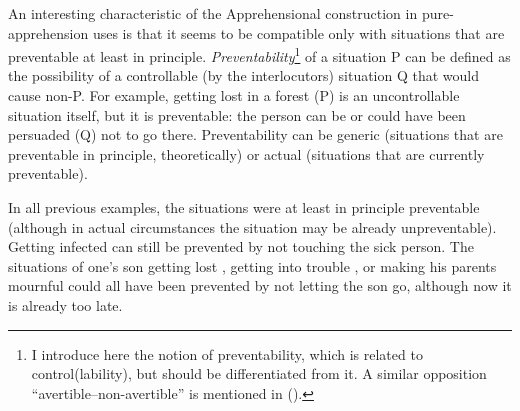 \documentclass[output=paper,colorlinks,citecolor=brown]{langscibook}
\begin{document}
\z



\z

 An interesting characteristic of the Apprehensional construction in pure\hyp apprehension uses is that it seems to be compatible only with situations that are preventable at least in principle. \textit{Preventability}\footnote{I introduce here the notion of preventability, which is related to control(lability), but should be differentiated from it. A similar opposition ``avertible--non-avertible'' is mentioned in \citeauthor{lichtenberk1995} (\citeyear[311]{lichtenberk1995}).} of a situation P can be defined as the possibility of a controllable (by the interlocutors) situation Q that would cause non-P. For example, getting lost in a forest (P) is an uncontrollable situation itself, but it is preventable: the person can be or could have been persuaded (Q) not to go there. Preventability can be generic (situations that are preventable in principle, theoretically) or actual (situations that are currently preventable).

In all previous examples, the situations were at least in principle preventable (although in actual circumstances the situation may be already unpreventable). Getting infected  can still be prevented by not touching the sick person. The situations of one's son getting lost , getting into trouble , or making his parents mournful  could all have been prevented by not letting the son go, although now it is already too late.
\end{document}
